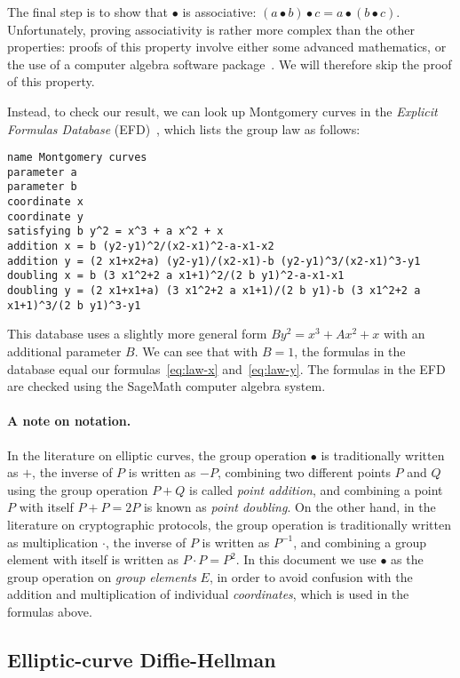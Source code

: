 \documentclass{article}
\begin{document}
The final step is to show that $\bullet$ is associative: $(a \bullet b) \bullet c = a \bullet (b \bullet c)$.
Unfortunately, proving associativity is rather more complex than the other properties: proofs of this property involve either some advanced mathematics, or the use of a computer algebra software package~\cite{Friedl:2017js,Fujii:2017eb}.
We will therefore skip the proof of this property.

Instead, to check our result, we can look up Montgomery curves in the \emph{Explicit Formulas Database} (EFD)~\cite{MontgomeryEFD}, which lists the group law as follows:
\begin{verbatim}
name Montgomery curves
parameter a
parameter b
coordinate x
coordinate y
satisfying b y^2 = x^3 + a x^2 + x
addition x = b (y2-y1)^2/(x2-x1)^2-a-x1-x2
addition y = (2 x1+x2+a) (y2-y1)/(x2-x1)-b (y2-y1)^3/(x2-x1)^3-y1
doubling x = b (3 x1^2+2 a x1+1)^2/(2 b y1)^2-a-x1-x1
doubling y = (2 x1+x1+a) (3 x1^2+2 a x1+1)/(2 b y1)-b (3 x1^2+2 a x1+1)^3/(2 b y1)^3-y1
\end{verbatim}
This database uses a slightly more general form $B y^2 = x^3 + A x^2 + x$ with an additional parameter $B$.
We can see that with $B=1$, the formulas in the database equal our formulas~\eqref{eq:law-x} and~\eqref{eq:law-y}.
The formulas in the EFD are checked using the SageMath computer algebra system.

\paragraph{A note on notation.}
In the literature on elliptic curves, the group operation $\bullet$ is traditionally written as $+$, the inverse of $P$ is written as $-P$, combining two different points $P$ and $Q$ using the group operation $P+Q$ is called \emph{point addition}, and combining a point $P$ with itself $P+P=2P$ is known as \emph{point doubling}.
On the other hand, in the literature on cryptographic protocols, the group operation is traditionally written as multiplication $\cdot$, the inverse of $P$ is written as $P^{-1}$, and combining a group element with itself is written as $P \cdot P = P^2$.
In this document we use $\bullet$ as the group operation on \emph{group elements} $E$, in order to avoid confusion with the addition and multiplication of individual \emph{coordinates}, which is used in the formulas above.

\subsection{Elliptic-curve Diffie-Hellman}\label{sec:ecdh}
\end{document}
